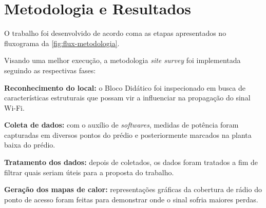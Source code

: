 \chapter{Metodologia e Resultados}
\label{cap:metodologia-e-resultados}

O trabalho foi desenvolvido de acordo coma as etapas apresentados no fluxograma da \autoref{fig:flux-metodologia}.

Visando uma melhor execução, a metodologia \textit{site survey} foi implementada seguindo as respectivas fases:
\begin{compactitem}
	\item \textbf{Reconhecimento do local:} o Bloco Didático foi inspecionado em busca de características estruturais que possam vir a influenciar na propagação do sinal Wi-Fi.
	
	\item \textbf{Coleta de dados:} com o auxílio de \textit{softwares}, medidas de potência foram capturadas em diversos pontos do prédio e posteriormente marcados na planta baixa do prédio.
	
	\item \textbf{Tratamento dos dados:} depois de coletados, os dados foram tratados a fim de filtrar quais seriam úteis para a proposta do trabalho.
	
	\item \textbf{Geração dos mapas de calor:} representações gráficas da cobertura de rádio do ponto de acesso foram feitas para demonstrar onde o sinal sofria maiores perdas.
\end{compactitem}

